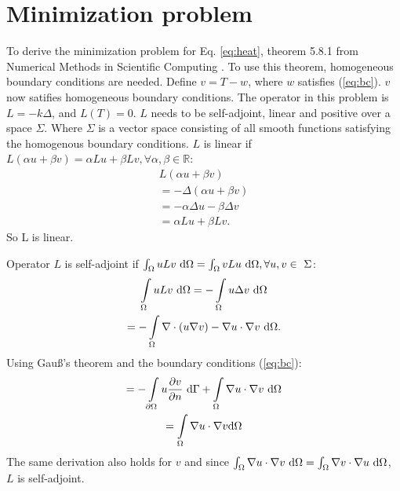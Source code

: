 \section{Minimization problem}
To derive the minimization problem for Eq. \ref{eq:heat}, theorem 5.8.1 from Numerical Methods in Scientific Computing \cite{kan}. To use this theorem, homogeneous boundary conditions are needed. Define $v=T-w$, where $w$ satisfies (\ref{eq:bc}). $v$ now satifies homogeneous boundary conditions. The operator in this problem is $L=-k\Delta$, and $L(T)=0$. $L$ needs to be self-adjoint, linear and positive over a space $\Sigma$. Where $\Sigma$ is a vector space consisting of all smooth functions satisfying the homogenous boundary conditions. $L$ is linear if $L(\alpha u+\beta v)=\alpha Lu+\beta Lv, \forall\alpha,\beta\in\mathbb{R}$:
\begin{gather*}
    L(\alpha u+\beta v)\\
    =-\Delta(\alpha u + \beta v)\\
    =-\alpha\Delta u-\beta \Delta v\\
    = \alpha Lu+\beta Lv.
\end{gather*}So L is linear.

Operator $L$ is self-adjoint if $\int\displaylimits_\Omega uLv~\mathrm{d}\Omega=\int\displaylimits_\Omega vLu~\mathrm{d}\Omega, \forall u,v\in~\Sigma$:
\begin{gather*}
    \int\displaylimits_\Omega uLv~\mathrm{d}\Omega = -\int\displaylimits_\Omega u\Delta v~\mathrm{d}\Omega\\
    =-\int\displaylimits_\Omega \nabla \cdot (u\nabla v) - \nabla u\cdot\nabla v~\mathrm{d}\Omega.
\end{gather*}
Using Gau\ss's theorem and the boundary conditions (\ref{eq:bc}):
\begin{gather*}
    =-\int\displaylimits_{\partial\Omega} u\frac{\partial v}{\partial n}~\mathrm{d}\Gamma + \int\displaylimits_\Omega \nabla u\cdot\nabla v~\mathrm{d}\Omega\\
    =\int\displaylimits_\Omega \nabla u\cdot \nabla v\mathrm{d}\Omega
\end{gather*}
The same derivation also holds for $v$ and since $\int\displaylimits_\Omega \nabla u\cdot \nabla v~\mathrm{d}\Omega = \int\displaylimits_\Omega \nabla v\cdot \nabla u~\mathrm{d}\Omega$, $L$ is self-adjoint.

